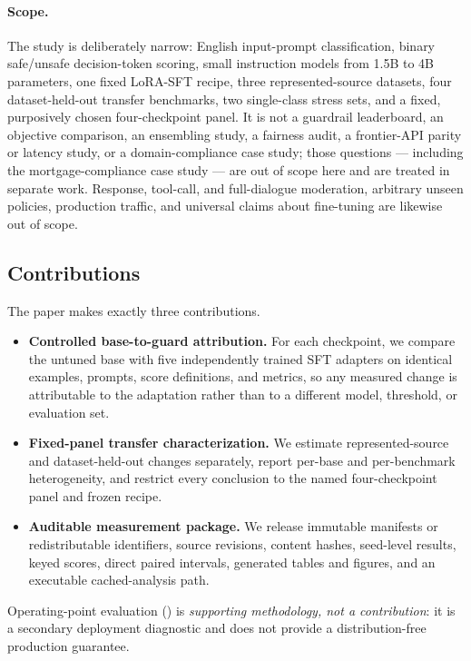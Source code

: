 \documentclass[sigconf,nonacm]{acmart}
\begin{document}
\paragraph{Scope.} The study is deliberately narrow: English input-prompt classification, binary safe/unsafe decision-token scoring, small instruction models from 1.5B to 4B parameters, one fixed LoRA-SFT recipe, three represented-source datasets, four dataset-held-out transfer benchmarks, two single-class stress sets, and a fixed, purposively chosen four-checkpoint panel. It is not a guardrail leaderboard, an objective comparison, an ensembling study, a fairness audit, a frontier-API parity or latency study, or a domain-compliance case study; those questions --- including the mortgage-compliance case study --- are out of scope here and are treated in separate work. Response, tool-call, and full-dialogue moderation, arbitrary unseen policies, production traffic, and universal claims about fine-tuning are likewise out of scope.

\subsection{Contributions}
\label{sec:contributions}

The paper makes exactly three contributions.

\begin{itemize}
  \item \textbf{Controlled base-to-guard attribution.} For each checkpoint, we compare the untuned base with five independently trained SFT adapters on identical examples, prompts, score definitions, and metrics, so any measured change is attributable to the adaptation rather than to a different model, threshold, or evaluation set.
  \item \textbf{Fixed-panel transfer characterization.} We estimate represented-source and dataset-held-out changes separately, report per-base and per-benchmark heterogeneity, and restrict every conclusion to the named four-checkpoint panel and frozen recipe.
  \item \textbf{Auditable measurement package.} We release immutable manifests or redistributable identifiers, source revisions, content hashes, seed-level results, keyed scores, direct paired intervals, generated tables and figures, and an executable cached-analysis path.
\end{itemize}

Operating-point evaluation () is \emph{supporting methodology, not a contribution}: it is a secondary deployment diagnostic and does not provide a distribution-free production guarantee.
\end{document}
